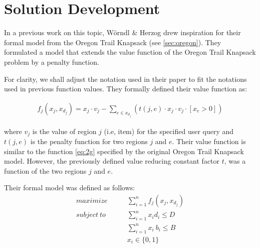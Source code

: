 
\chapter{Solution Development}\label{chapter:analysis}
In a previous work on this topic, Wörndl \& Herzog  \parencite{cbrecsys2014} drew inspiration for their formal model from the Oregon Trail Knapsack (see \ref{sec:oregon}). They formulated a model that extends the value function of the Oregon Trail Knapsack problem by a penalty function.

For clarity, we shall adjust the notation used in their paper to fit the notations used in previous function values. They formally defined their value function as:

\begin{gather}
 \tag{1} f_j(x_j, x_{d_j}) = x_j \cdot v_j - \sum_{e \in x_{d_j}} ( t(j, e) \cdot x_j \cdot v_j \cdot [x_e > 0])\label{eq:3d}
\end{gather}

where $v_j$ is the value of region $j$ (i.e, item) for the specified user query and $t(j, e)$ is the penalty function for two regions $j$ and $e$. Their value function is similar to the function \ref{eq:2g} specified by the original Oregon Trail Knapsack model. However, the previously defined value reducing constant factor $t$, was a function of the two regions $j$ and $e$. 

Their formal model was defined as follows:
\begin{align}
    \tag{1}maximize \qquad  &\sum_{i=1}^n  f_j(x_j, x_{d_j}) \label{eq:3a}\\
    \tag{2}subject \ to \qquad &\sum_{i=1}^n x_i d_i  \leq D \label{eq:3b}\\
    \tag{3}&\sum_{i=1}^n x_i\ b_i \leq B \label{eq:3c}\\
    \tag{4} &x_i \in \{0,1\}
\end{align}

